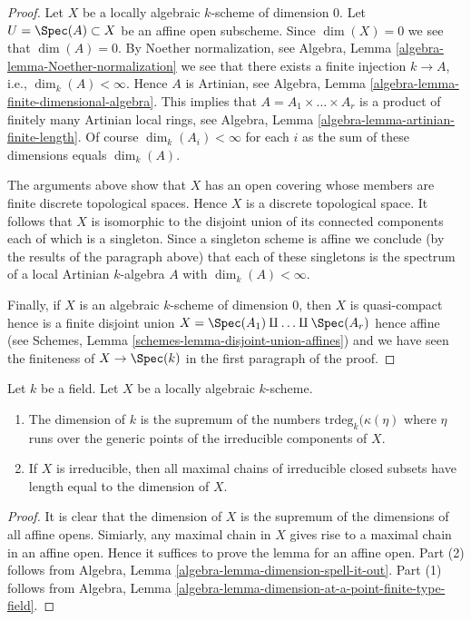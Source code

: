 \begin{proof}
Let $X$ be a locally algebraic $k$-scheme of dimension $0$.
Let $U = \Spec(A) \subset X$ be an affine open subscheme.
Since $\dim(X) = 0$ we see that $\dim(A) = 0$.
By Noether normalization, see
Algebra, Lemma \ref{algebra-lemma-Noether-normalization}
we see that there exists a finite injection $k \to A$, i.e.,
$\dim_k(A) < \infty$. Hence $A$ is Artinian, see
Algebra, Lemma \ref{algebra-lemma-finite-dimensional-algebra}.
This implies that $A = A_1 \times \ldots \times A_r$ is a product
of finitely many Artinian local rings, see
Algebra, Lemma \ref{algebra-lemma-artinian-finite-length}.
Of course $\dim_k(A_i) < \infty$ for each $i$ as the sum of
these dimensions equals $\dim_k(A)$.

\medskip\noindent
The arguments above show that $X$ has an open covering whose members are
finite discrete topological spaces. Hence $X$ is a discrete topological space.
It follows that $X$ is isomorphic to the disjoint union of its connected
components each of which is a singleton. Since a singleton scheme is affine
we conclude (by the results of the paragraph above) that each of these
singletons is the spectrum of a local Artinian $k$-algebra $A$ with
$\dim_k(A) < \infty$.

\medskip\noindent
Finally, if $X$ is an algebraic $k$-scheme of dimension $0$, then
$X$ is quasi-compact hence is a finite disjoint union
$X = \Spec(A_1) \amalg \ldots \amalg \Spec(A_r)$
hence affine (see
Schemes, Lemma \ref{schemes-lemma-disjoint-union-affines})
and we have seen the finiteness of $X \to \Spec(k)$ in the
first paragraph of the proof.
\end{proof}

\begin{lemma}
\label{lemma-dimension-locally-algebraic}
Let $k$ be a field. Let $X$ be a locally algebraic $k$-scheme.
\begin{enumerate}
\item The dimension of $k$ is the supremum of the numbers
$\text{trdeg}_k(\kappa(\eta)$ where $\eta$ runs over the
generic points of the irreducible components of $X$.
\item If $X$ is irreducible, then all maximal chains of irreducible
closed subsets have length equal to the dimension of $X$.
\end{enumerate}
\end{lemma}

\begin{proof}
It is clear that the dimension of $X$ is the supremum of the
dimensions of all affine opens. Simiarly, any maximal chain
in $X$ gives rise to a maximal chain in an affine open. Hence it
suffices to prove the lemma for an affine open.
Part (2) follows from Algebra, Lemma
\ref{algebra-lemma-dimension-spell-it-out}.
Part (1) follows from Algebra, Lemma
\ref{algebra-lemma-dimension-at-a-point-finite-type-field}.
\end{proof}






